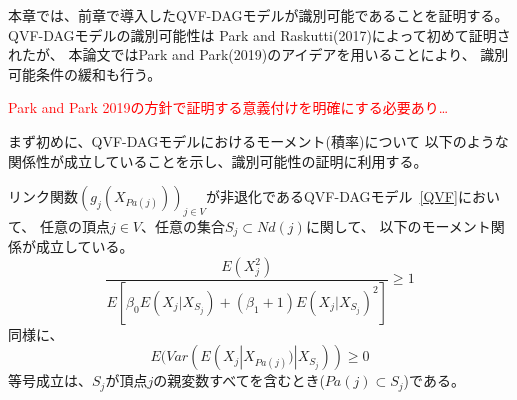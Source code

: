 

本章では、前章で導入したQVF-DAGモデル\cite{Park2017-hw}が識別可能であることを証明する。
QVF-DAGモデルの識別可能性は
Park and Raskutti(2017)\cite{Park2017-hw}によって初めて証明されたが、
本論文ではPark and Park(2019)\cite{Park2019-qy}のアイデアを用いることにより、
識別可能条件の緩和も行う。

\textcolor{red}{Park and Park 2019の方針で証明する意義付けを明確にする必要あり…}

まず初めに、QVF-DAGモデルにおけるモーメント(積率)について
以下のような関係性が成立していることを示し、識別可能性の証明に利用する。

\begin{prop} \label{prop:MRS}
  リンク関数$(g_j(X_{Pa(j)}))_{j \in V}$が非退化であるQVF-DAGモデル~\eqref{QVF}において、
  任意の頂点$j \in V$、任意の集合$S_j \subset \mathit{Nd}(j)$に関して、
  以下のモーメント関係が成立している。
  \begin{equation}
    \frac{E(X_j^2)}
    {E \left[ \beta_0 E(X_j | X_{S_j}) + (\beta_1 + 1)E(X_j | X_{S_j})^2 \right]}
    \geq 1
    \label{eq:MRS}
  \end{equation}
  同様に、
  \begin{equation}
    E(\mathit{Var}( E(X_j | X_{Pa(j)}) | X_{S_j} )) \geq 0
  \end{equation}
  等号成立は、$S_j$が頂点$j$の親変数すべてを含むとき($Pa(j)\subset S_j$)である。
\end{prop}

